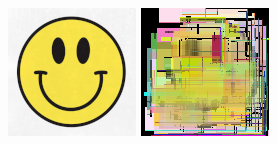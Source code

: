 \documentclass[a4paper,twocolumn]{article}
\begin{document}
\begin{figure}[h!]
        \centering
        \begin{minipage}[t]{0.08\textwidth}
                \centering
                \includegraphics[width=\linewidth]{data/smiley.jpg}
        \end{minipage} \label{fig:sbs-1}
        \begin{minipage}[t]{0.08\textwidth}
                \centering
                \includegraphics[width=\linewidth]{data/test1.png}

\end{minipage}
\end{figure}
\end{document}
